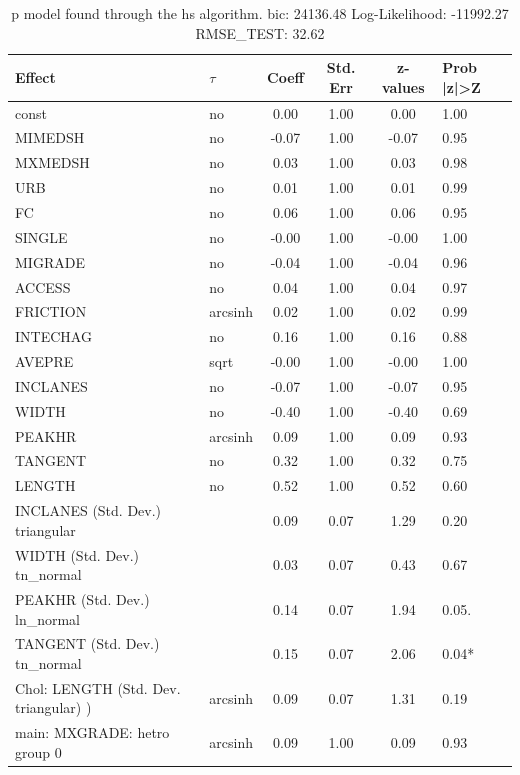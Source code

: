 \begin{table}
	\caption{p model found through the hs algorithm. bic: 24136.48 Log-Likelihood: -11992.27 RMSE_TEST: 32.62}
	\begin{center}
		\begin{tabular}{|l|l|c|c|c|l|}
			\hline
			Effect & $\tau$ & Coeff & Std. Err & z-values & Prob |z|>Z \\
			\hline
			const & no & 0.00 & 1.00 & 0.00 & 1.00 \\
			\hline
			MIMEDSH & no & -0.07 & 1.00 & -0.07 & 0.95 \\
			\hline
			MXMEDSH & no & 0.03 & 1.00 & 0.03 & 0.98 \\
			\hline
			URB & no & 0.01 & 1.00 & 0.01 & 0.99 \\
			\hline
			FC & no & 0.06 & 1.00 & 0.06 & 0.95 \\
			\hline
			SINGLE & no & -0.00 & 1.00 & -0.00 & 1.00 \\
			\hline
			MIGRADE & no & -0.04 & 1.00 & -0.04 & 0.96 \\
			\hline
			ACCESS & no & 0.04 & 1.00 & 0.04 & 0.97 \\
			\hline
			FRICTION & arcsinh & 0.02 & 1.00 & 0.02 & 0.99 \\
			\hline
			INTECHAG & no & 0.16 & 1.00 & 0.16 & 0.88 \\
			\hline
			AVEPRE & sqrt & -0.00 & 1.00 & -0.00 & 1.00 \\
			\hline
			INCLANES & no & -0.07 & 1.00 & -0.07 & 0.95 \\
			\hline
			WIDTH & no & -0.40 & 1.00 & -0.40 & 0.69 \\
			\hline
			PEAKHR & arcsinh & 0.09 & 1.00 & 0.09 & 0.93 \\
			\hline
			TANGENT & no & 0.32 & 1.00 & 0.32 & 0.75 \\
			\hline
			LENGTH & no & 0.52 & 1.00 & 0.52 & 0.60 \\
			\hline
			INCLANES (Std. Dev.) triangular &  & 0.09 & 0.07 & 1.29 & 0.20 \\
			\hline
			WIDTH (Std. Dev.) tn_normal &  & 0.03 & 0.07 & 0.43 & 0.67 \\
			\hline
			PEAKHR (Std. Dev.) ln_normal &  & 0.14 & 0.07 & 1.94 & 0.05. \\
			\hline
			TANGENT (Std. Dev.) tn_normal &  & 0.15 & 0.07 & 2.06 & 0.04* \\
			\hline
			 Chol: LENGTH (Std. Dev. triangular) ) & arcsinh & 0.09 & 0.07 & 1.31 & 0.19 \\
			\hline
			main: MXGRADE: hetro group 0 & arcsinh & 0.09 & 1.00 & 0.09 & 0.93 \\

\end{tabular}
\end{center}
\end{table}
